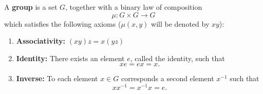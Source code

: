 A \textbf{group} is a set $G$, together with a binary law of composition
$$\mu: G \times G \rightarrow G$$
which satisfies the following axioms ($\mu(x, y)$ will be denoted by $xy$):

\begin{enumerate}
  \item \textbf{Associativity:} $(xy)z = x(yz)$
  \item \textbf{Identity:} There exists an element $e$, called the identity, such that
  $$xe = ex = x.$$
  \item \textbf{Inverse:} To each element $x \in G$ corresponds a second element $x^{-1}$ such that
  $$xx^{-1} = x^{-1}x = e.$$
\end{enumerate}
